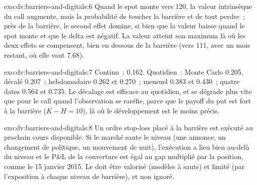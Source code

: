 \begin{solution}{exo:dv:barriers-and-digitals:6}
Quand le spot monte vers 120, la valeur intrinsèque du call augmente, mais la probabilité de toucher la barrière et
de tout perdre~; près de la barrière, le second effet domine, si bien que la valeur baisse quand le spot monte et que le delta est
négatif. La valeur atteint son maximum là où les deux effets se compensent, bien en dessous de la barrière (vers 111, avec un mois restant, où elle vaut 7.68).
\end{solution}

\begin{solution}{exo:dv:barriers-and-digitals:7}
Continu~: 0.162. Quotidien~: Monte Carlo 0.205, décalé 0.207~; hebdomadaire 0.262 et 0.270~; mensuel 0.383 et 0.430~; quatre dates 0.564
et 0.735. Le décalage est efficace au quotidien, et se dégrade plus vite que pour le call quand l'observation se raréfie, parce que le
payoff du put est fort à la barrière ($K-H=10$), là où le développement est le moins précis.
\end{solution}

\begin{solution}{exo:dv:barriers-and-digitals:8}
Un ordre stop-loss placé à la barrière est exécuté au prochain cours disponible. Si le marché saute le niveau (une
annonce, un changement de politique, un mouvement de nuit), l'exécution a lieu bien au-delà du niveau et le P\&L de la couverture est égal au gap multiplié par la
position, comme le 15 janvier 2015. Le  doit être valorisé (modèles à sauts) et limité (par l'exposition à chaque niveau de barrière),
et non ignoré.
\end{solution}

